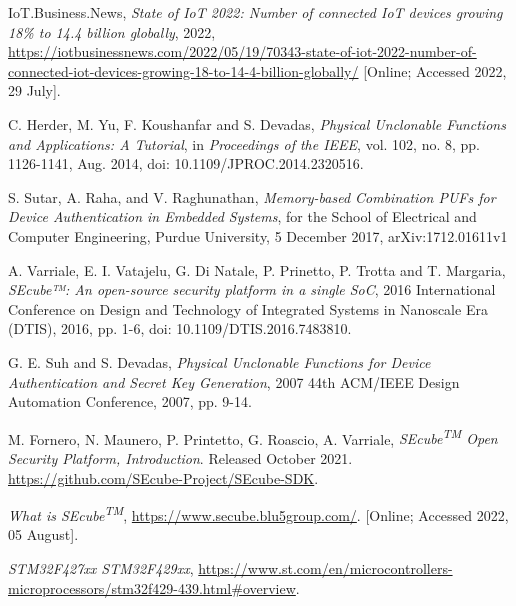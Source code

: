 \begin{thebibliography}{9}

IoT.Business.News, \emph{State of IoT 2022: Number of connected IoT devices growing 18\% to 14.4 billion globally},  2022, \url{https://iotbusinessnews.com/2022/05/19/70343-state-of-iot-2022-number-of-connected-iot-devices-growing-18-to-14-4-billion-globally/} [Online; Accessed 2022, 29 July].

C. Herder, M. Yu, F. Koushanfar and S. Devadas, \emph{Physical Unclonable Functions and Applications: A Tutorial}, in \emph{Proceedings of the IEEE}, vol. 102, no. 8, pp. 1126-1141, Aug. 2014, doi: 10.1109/JPROC.2014.2320516.

S. Sutar, A. Raha, and V. Raghunathan, \emph{Memory-based Combination PUFs for Device Authentication in Embedded Systems}, for the School of Electrical and Computer Engineering, Purdue University, 5 December 2017, arXiv:1712.01611v1

A. Varriale, E. I. Vatajelu, G. Di Natale, P. Prinetto, P. Trotta and T. Margaria, \emph{SEcube™: An open-source security platform in a single SoC}, 2016 International Conference on Design and Technology of Integrated Systems in Nanoscale Era (DTIS), 2016, pp. 1-6, doi: 10.1109/DTIS.2016.7483810.

G. E. Suh and S. Devadas, \emph{Physical Unclonable Functions for Device Authentication and Secret Key Generation}, 2007 44th ACM/IEEE Design Automation Conference, 2007, pp. 9-14.

M. Fornero, N. Maunero, P. Printetto, G. Roascio, A. Varriale, \emph{SEcube\textsuperscript{TM} Open Security Platform, Introduction}. Released October 2021. \url{https://github.com/SEcube-Project/SEcube-SDK}. 

\emph{What is SEcube\textsuperscript{TM}},  \url{https://www.secube.blu5group.com/}. [Online; Accessed 2022, 05 August].

\emph{STM32F427xx STM32F429xx}, \url{https://www.st.com/en/microcontrollers-microprocessors/stm32f429-439.html#overview}. 

    
\end{thebibliography}